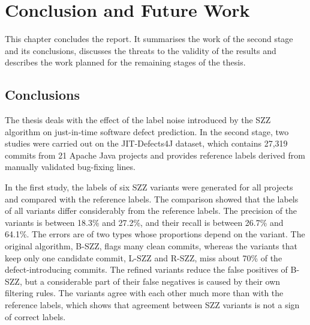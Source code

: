 \documentclass[12pt,a4paper,oneside]{report}
\begin{document}
\chapter{Conclusion and Future Work}\label{ch:conclusion}

This chapter concludes the report. It summarises the work of the second stage
and its conclusions, discusses the threats to the validity of the results and
describes the work planned for the remaining stages of the thesis.

\section{Conclusions}

The thesis deals with the effect of the label noise introduced by the SZZ
algorithm on just-in-time software defect prediction. In the second stage,
two studies were carried out on the JIT-Defects4J dataset, which contains
27,319 commits from 21 Apache Java projects and provides reference labels
derived from manually validated bug-fixing lines.

In the first study, the labels of six SZZ variants were generated for all
projects and compared with the reference labels. The comparison showed that
the labels of all variants differ considerably from the reference labels.
The precision of the variants is between 18.3\% and 27.2\%, and their recall
is between 26.7\% and 64.1\%. The errors are of two types whose proportions
depend on the variant. The original algorithm, B-SZZ, flags many clean
commits, whereas the variants that keep only one candidate commit, L-SZZ and
R-SZZ, miss about 70\% of the defect-introducing commits. The refined
variants reduce the false positives of B-SZZ, but a considerable part of
their false negatives is caused by their own filtering rules. The variants
agree with each other much more than with the reference labels, which shows
that agreement between SZZ variants is not a sign of correct labels.
\end{document}
